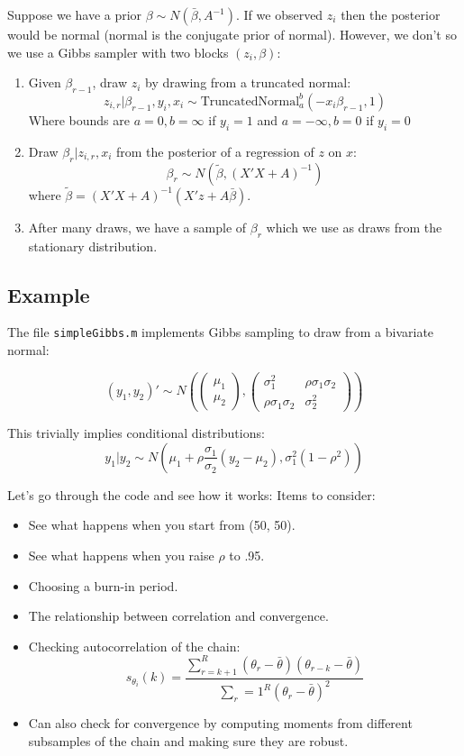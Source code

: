 \documentclass[twoside]{article}
\begin{document}
Suppose we have a prior $\beta \sim N(\bar{\beta}, A^{-1})$. If we observed $z_i$ then the posterior would be normal (normal is the conjugate prior of normal). However, we don't so we use a Gibbs sampler with two blocks $(z_i, \beta)$:

\begin{enumerate}
\item Given $\beta_{r-1}$, draw $z_i$ by drawing from a truncated normal: 
$$ z_{i, r} | \beta_{r-1}, y_i, x_i \sim \mbox{TruncatedNormal}_a^b(-x_i \beta_{r-1}, 1) $$
Where bounds are $a = 0, b = \infty$ if $y_i = 1$ and $a = -\infty, b = 0$ if $y_i = 0$
\item Draw $\beta_r | z_{i,r}, x_i$ from the posterior of a regression of $z$ on $x$:
$$\beta_r \sim N(\tilde{\beta}, (X'X + A)^{-1})$$
where $\tilde{\beta} = (X'X + A)^{-1}(X'z + A\bar{\beta})$. 
\item After many draws, we have a sample of $\beta_r$ which we use as draws from the stationary distribution. 
\end{enumerate}

\subsection{Example}

The file {\tt simpleGibbs.m} implements Gibbs sampling to draw from a bivariate normal: 

$$(y_1, y_2)' \sim N\left( \begin{pmatrix} \mu_1 \\ \mu_2 \end{pmatrix}, \begin{pmatrix} \sigma_1^2 & \rho \sigma_1 \sigma_2 \\ \rho \sigma_1 \sigma_2 & \sigma_2^2 \end{pmatrix} \right) $$

This trivially implies conditional distributions: 
$$y_1 | y_2 \sim N(\mu_1 + \rho \frac{\sigma_1}{\sigma_2}(y_2 - \mu_2), \sigma_1^2(1 - \rho^2))$$

Let's go through the code and see how it works: 
Items to consider: 
\begin{itemize}
\item See what happens when you start from (50, 50). 
\item See what happens when you raise $\rho$ to .95. 
\item Choosing a burn-in period. 
\item The relationship between correlation and convergence. 
\item Checking autocorrelation of the chain: 
$$s_{\theta_i}(k) = \frac{ \sum_{r = k+1}^R (\theta_r - \bar{\theta})(\theta_{r-k} - \bar{\theta})}{ \sum_r=1^R  (\theta_r - \bar{\theta})^2} $$
\item Can also check for convergence by computing moments from different subsamples of the chain and making sure they are robust.
\end{itemize}
\end{document}
